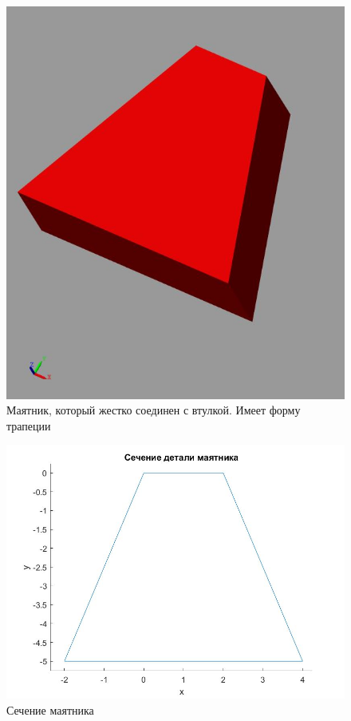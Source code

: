 \documentclass{article}
\begin{document}
	\begin{figure}[H]
		\centering
		\includegraphics[width=0.7\linewidth]{trap3d}
		\caption{Маятник, который жестко соединен с втулкой. Имеет форму трапеции}
		\label{fig:trap3d}
	\end{figure}
	\begin{figure}[H]
		\centering
		\includegraphics[width=0.7\linewidth]{trap}
		\caption{Сечение маятника}
		\label{fig:trap}
	\end{figure}
	
\end{document}
